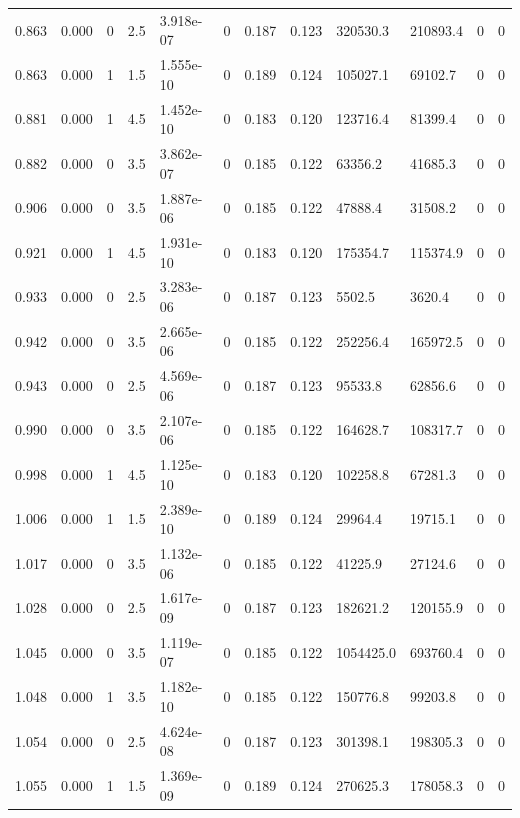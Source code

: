 \documentclass[preview]{standalone}
\begin{document}
{{{\begin{tabular}{L{1.2cm}C{1.2cm} C{0.3cm}C{0.5cm} C{1.4cm}C{1.4cm} C{1.4cm}C{1.4cm} C{1.6cm}C{1.6cm} C{1.6cm}C{1.6cm}}
  0.863  &  0.000  & 0     & 2.5 &  3.918e-07  & 0  &  0.187&   0.123& 320530.3 & 210893.4   &  0 & 0  \\ 
  0.863  &  0.000  & 1     & 1.5 &  1.555e-10  & 0  &  0.189&   0.124& 105027.1 & 69102.7   &  0 & 0  \\ 
  0.881  &  0.000  & 1     & 4.5 &  1.452e-10  & 0  &  0.183&   0.120& 123716.4 & 81399.4   &  0 & 0  \\ 
  0.882  &  0.000  & 0     & 3.5 &  3.862e-07  & 0  &  0.185&   0.122& 63356.2 & 41685.3   &  0 & 0  \\ 
  0.906  &  0.000  & 0     & 3.5 &  1.887e-06  & 0  &  0.185&   0.122& 47888.4 & 31508.2   &  0 & 0  \\ 
  0.921  &  0.000  & 1     & 4.5 &  1.931e-10  & 0  &  0.183&   0.120& 175354.7 & 115374.9   &  0 & 0  \\ 
  0.933  &  0.000  & 0     & 2.5 &  3.283e-06  & 0  &  0.187&   0.123& 5502.5 & 3620.4   &  0 & 0  \\ 
  0.942  &  0.000  & 0     & 3.5 &  2.665e-06  & 0  &  0.185&   0.122& 252256.4 & 165972.5   &  0 & 0  \\ 
  0.943  &  0.000  & 0     & 2.5 &  4.569e-06  & 0  &  0.187&   0.123& 95533.8 & 62856.6   &  0 & 0  \\ 
  0.990  &  0.000  & 0     & 3.5 &  2.107e-06  & 0  &  0.185&   0.122& 164628.7 & 108317.7   &  0 & 0  \\ 
  0.998  &  0.000  & 1     & 4.5 &  1.125e-10  & 0  &  0.183&   0.120& 102258.8 & 67281.3   &  0 & 0  \\ 
  1.006  &  0.000  & 1     & 1.5 &  2.389e-10  & 0  &  0.189&   0.124& 29964.4 & 19715.1   &  0 & 0  \\ 
  1.017  &  0.000  & 0     & 3.5 &  1.132e-06  & 0  &  0.185&   0.122& 41225.9 & 27124.6   &  0 & 0  \\ 
  1.028  &  0.000  & 0     & 2.5 &  1.617e-09  & 0  &  0.187&   0.123& 182621.2 & 120155.9   &  0 & 0  \\ 
  1.045  &  0.000  & 0     & 3.5 &  1.119e-07  & 0  &  0.185&   0.122& 1054425.0 & 693760.4   &  0 & 0  \\ 
  1.048  &  0.000  & 1     & 3.5 &  1.182e-10  & 0  &  0.185&   0.122& 150776.8 & 99203.8   &  0 & 0  \\ 
  1.054  &  0.000  & 0     & 2.5 &  4.624e-08  & 0  &  0.187&   0.123& 301398.1 & 198305.3   &  0 & 0  \\ 
  1.055  &  0.000  & 1     & 1.5 &  1.369e-09  & 0  &  0.189&   0.124& 270625.3 & 178058.3   &  0 & 0  \\ 

\end{tabular}}}}
\end{document}

